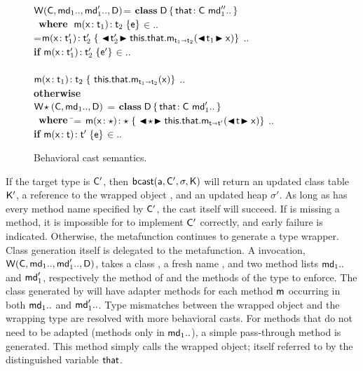 \documentclass[a4paper,USenglish]{lipics-v2018}
\newcommand{\bscast}[2]{\EM{\BehCast{#1}{{#2}}}}
\newcommand{\WHERE}{~\EM{\xt{\bf where}}~}
\newcommand{\HS}{\hspace{.2cm}}
\newcommand{\EM}[1]{\ensuremath{#1}\xspace}
\newcommand{\xt}[1]{{\sf{#1}}}
\newcommand{\bt}[1]{\xt{\bf #1}}
\newcommand{\EMxt}[1]{\EM{\xt{#1}}}
\newcommand{\x}{\EMxt x}
\newcommand{\m}{\EMxt m}
\newcommand{\s}{\EM{\sigma}}
\newcommand{\K}{\EMxt K}
\newcommand{\Kp}{{\EMxt{K'}}}
\renewcommand{\sp}{{{\EM{\s'}}}}
\newcommand{\Cp}{\EMxt{C'}}
\newcommand{\any}{\EM{\star}}
\newcommand{\this}{\EMxt{this}}
\newcommand{\that}{\EMxt{that}}
\newcommand{\FRead}[1]{\EM{\this.#1}}
\newcommand{\KCall}[5]{\EM{{#1}.{#2}_{{#4} \shortrightarrow {#5}}(#3)}}
\newcommand{\BehStart}{\EM{\blacktriangleleft}}
\newcommand{\BehEnd}{\EM{\blacktriangleright}}
\newcommand{\BehCast}[2]{\EM{\BehStart\! #1\! \BehEnd #2}}
\newcommand{\HT}[2]{\EM{{#1}\!:{#2}}}
\newcommand{\Mdef}[5]{\EM{ \HT{ #1( \HT{#2}{#3})}{#4}\;\{{#5}\}}}
\newcommand{\behcastS}[4]{\EM{\xt{bcast}(#1, #2, #3, #4)}}
\newcommand{\Class}[3]{\EM{\bt{class}\;#1\,\{\,#2~#3\,\}}}
\newcommand{\Fdef}[2]{\EM{ \HT{#1}{#2} }}
\newcommand{\wrap}[4]{\EM{\xt{W}(#1,#2,#3,#4)}}
\newcommand{\wrapAny}[3]{\EM{\xt{W}\!\any(#1,#2,#3)}}
\newcommand{\In}{\EM{\in}}
\newcommand{\src}[1]{\colorbox[gray]{0.89}{$#1$}}
\newcounter{lem}
\newcommand{\W}{\xt{W}\xspace}
\begin{document}
\begin{figure}[t]
\hspace{8mm}\begin{minipage}{12cm}\begin{tabbing}\small
\wrap\C{\md[1]..}{\mdp[1]..}\D = \src{\Class\D{\Fdef\that\C}{\mdpp[1]..}}\\
\HS\HS\WHERE\HS\= \Mdef\m\x{\t[1]}{\t[2]}\e\In\md[1].. \\
\> \mdpp[1] =\= \src{\Mdef\m\x{\tp[1]}{\tp[2]}{~\BehCast{\tp[2]}{\KCall{\FRead\that}\m{\bscast{\t[1]}\x}{\t[1]}{\t[2]}}}} .. \\
\> \> \HS\HS \= \textbf{if} \HS \Mdef\m\x{\tp[1]}{\tp[2]}\ep\In\mdp[1].. \\
\\[-3mm]
\> \> \src{\Mdef\m\x{\t[1]}{\t[2]}{~\KCall{\FRead\that}\m{\x}{\t[1]}{\t[2]}}} .. \\ \> \> \HS\HS \textbf{otherwise}
\\[2mm]
\wrapAny{\C}{\md[1]..}{\D} = \src{\Class \D{ \Fdef\that\C}{ \mdp[1]..}}\\
\HS\HS\WHERE\HS\=\mdp[1] = \src{ \Mdef\m\x{\any}{\any}{~\BehCast\any{ \KCall{\FRead\that} \m {\bscast{\t}\x}{\t}{\tp}} } } ..
\HS\HS\HS\HS \\ \> \> \HS\HS \= \textbf{if} \HS \Mdef\m\x{\t}{\tp}\e\In\md[1].. \\
\end{tabbing}\end{minipage}

\vspace{-2mm}

\hrulefill
\caption{Behavioral cast semantics.}\label{behavetext}
\end{figure}

If the target type is \Cp, then \behcastS\a\Cp\s\K will return an updated
class table \Kp, a reference to the wrapped object \ap, and an updated heap
\sp. As long as \a has every method name specified by \Cp, the cast itself
will succeed. If \a is missing a method, it is impossible for \a to
implement \Cp correctly, and early failure is indicated. Otherwise, the
metafunction continues to generate a type wrapper. Class generation itself
is delegated to the \W metafunction. A \W invocation,
\EM{\W(\C,\md_1..,\mdp_1.., \D)}, takes a class \C, a fresh name \D, and two
method lists $\md_1..$ and $\mdp_1$, respectively the method of \C and the
methods of the type to enforce. The class generated by \W will have adapter
methods for each method \m occurring in both $\md_1..$ and $\mdp_1..$. Type
mismatches between the wrapped object and the wrapping type are resolved
with more behavioral casts. For methods that do not need to be adapted
(methods only in $\md_1..$), a simple pass-through method is generated. This
method simply calls the wrapped object; itself referred to by the
distinguished variable \that.
\end{document}
